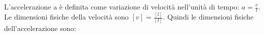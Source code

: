 L'accelerazione a è definita come variazione di velocità 
nell'unità di tempo: $\displaystyle a = \frac{v}{t}$. 
Le dimensioni fisiche della velocità sono 
$\displaystyle [v] = \frac{[l]}{[t]}$. 
Quindi le dimensioni fisiche dell'accelerazione sono: